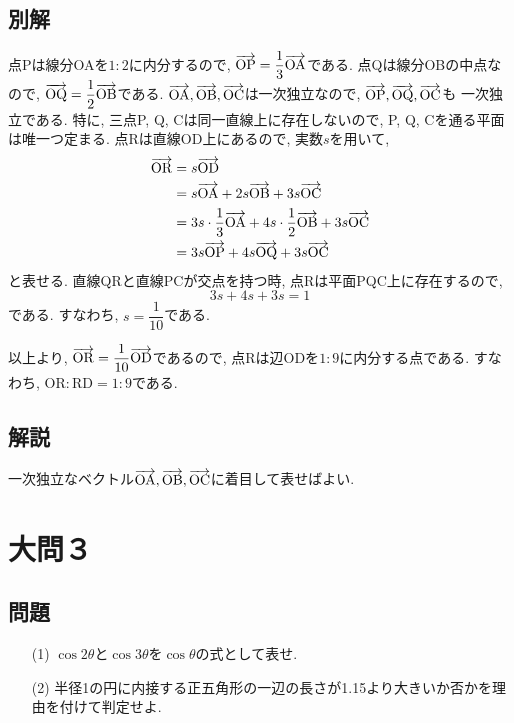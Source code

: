 \documentclass[dvipdfmx,a4paper]{jsarticle}
\begin{document}
    \subsection{別解}
    点Pは線分OAを$1 : 2$に内分するので, $\overrightarrow{\mathrm{OP}} = \dfrac{1}{3}\overrightarrow{\mathrm{OA}}$である. 
    点Qは線分OBの中点なので, $\overrightarrow{\mathrm{OQ}} = \dfrac{1}{2}\overrightarrow{\mathrm{OB}}$である. 
    $\overrightarrow{\mathrm{OA}}, \overrightarrow{\mathrm{OB}}, \overrightarrow{\mathrm{OC}}$は一次独立なので, $\overrightarrow{\mathrm{OP}}, \overrightarrow{\mathrm{OQ}}, \overrightarrow{\mathrm{OC}}$も
    一次独立である. 特に, 三点P, Q, Cは同一直線上に存在しないので, P, Q, Cを通る平面は唯一つ定まる. 
    点Rは直線OD上にあるので, 実数$s$を用いて, 
    \begin{align*}
        \overrightarrow{\mathrm{OR}} &= s \overrightarrow{\mathrm{OD}} \\
        &= s\overrightarrow{\mathrm{OA}} + 2s\overrightarrow{\mathrm{OB}} + 3s\overrightarrow{\mathrm{OC}} \\
        &= 3s \cdot \dfrac{1}{3}\overrightarrow{\mathrm{OA}} + 4s \cdot \dfrac{1}{2}\overrightarrow{\mathrm{OB}} + 3s\overrightarrow{\mathrm{OC}} \\
        &= 3s \overrightarrow{\mathrm{OP}} + 4s\overrightarrow{\mathrm{OQ}} + 3s\overrightarrow{\mathrm{OC}}
    \end{align*}
    と表せる. 直線QRと直線PCが交点を持つ時, 点Rは平面PQC上に存在するので, 
    \begin{equation*}
        3s + 4s + 3s = 1
    \end{equation*}
    である. すなわち, $s = \dfrac{1}{10}$である. 

    以上より, $\overrightarrow{\mathrm{OR}} =  \dfrac{1}{10}\overrightarrow{\mathrm{OD}}$であるので, 点Rは辺ODを$1:9$に内分する点である. 
    すなわち, $\mathrm{OR} : \mathrm{RD} = 1:9$である. 
    
    \subsection{解説}
    一次独立なベクトル$\overrightarrow{\mathrm{OA}},\overrightarrow{\mathrm{OB}},\overrightarrow{\mathrm{OC}}$に着目して表せばよい. 

    \section{大問３}
    \subsection{問題}
    \begin{itemize}
        \item [(1)] $\cos 2\theta$と$\cos 3\theta$を$\cos \theta$の式として表せ. 
        \item [(2)] 半径1の円に内接する正五角形の一辺の長さが1.15より大きいか否かを理由を付けて判定せよ. 
    \end{itemize}
\end{document}

